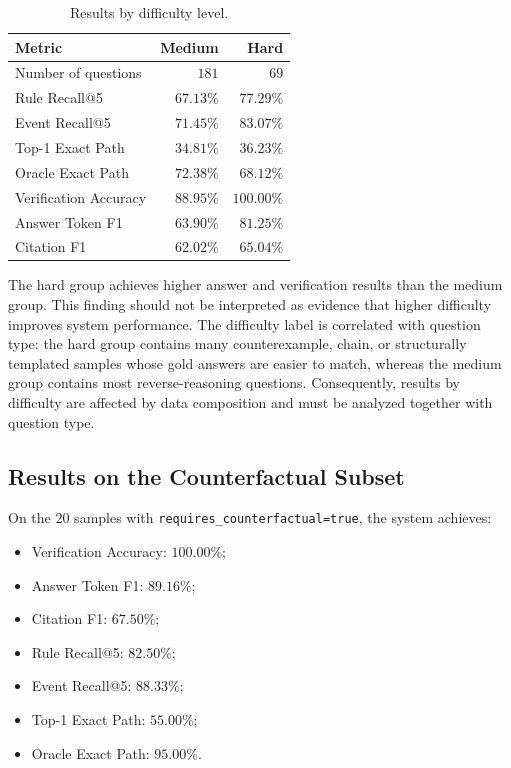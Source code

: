 \begin{table}[t]
    \centering
    \caption{Results by difficulty level.}
    \label{tab:difficulty-results}
    \begin{tabular}{lrr}
        \hline
        \textbf{Metric} & \textbf{Medium} & \textbf{Hard} \\
        \hline
        Number of questions & \(181\) & \(69\) \\
        Rule Recall@5 & \(67.13\%\) & \(77.29\%\) \\
        Event Recall@5 & \(71.45\%\) & \(83.07\%\) \\
        Top-1 Exact Path & \(34.81\%\) & \(36.23\%\) \\
        Oracle Exact Path & \(72.38\%\) & \(68.12\%\) \\
        Verification Accuracy & \(88.95\%\) & \(100.00\%\) \\
        Answer Token F1 & \(63.90\%\) & \(81.25\%\) \\
        Citation F1 & \(62.02\%\) & \(65.04\%\) \\
        \hline
    \end{tabular}
\end{table}

The hard group achieves higher answer and verification results than the
medium group. This finding should not be interpreted as evidence that
higher difficulty improves system performance. The difficulty label is
correlated with question type: the hard group contains many counterexample,
chain, or structurally templated samples whose gold answers are easier to
match, whereas the medium group contains most reverse-reasoning questions.
Consequently, results by difficulty are affected by data composition and
must be analyzed together with question type.

\subsection{Results on the Counterfactual Subset}

On the \(20\) samples with
\texttt{requires\_counterfactual=true}, the system achieves:

\begin{itemize}
    \item Verification Accuracy: \(100.00\%\);
    \item Answer Token F1: \(89.16\%\);
    \item Citation F1: \(67.50\%\);
    \item Rule Recall@5: \(82.50\%\);
    \item Event Recall@5: \(88.33\%\);
    \item Top-1 Exact Path: \(55.00\%\);
    \item Oracle Exact Path: \(95.00\%\).
\end{itemize}

